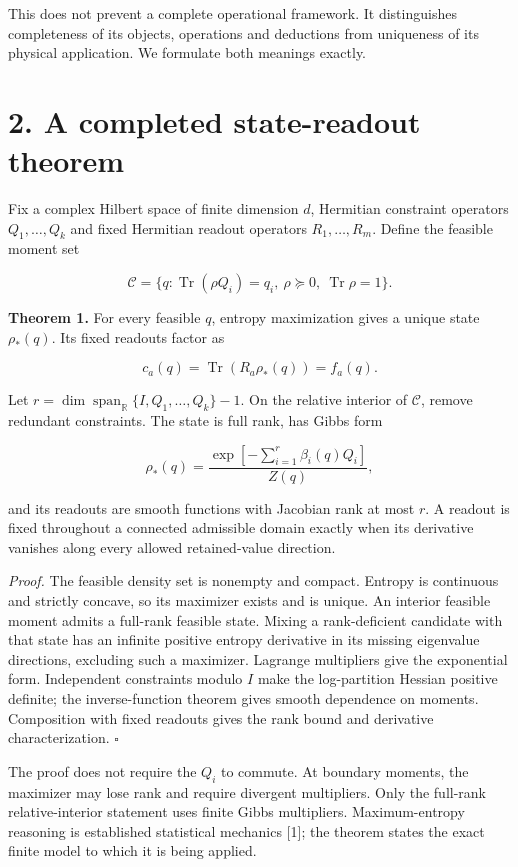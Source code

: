 \documentclass[
  11pt,
  a4paper,
]{article}
\begin{document}
This does not prevent a complete operational framework. It distinguishes completeness of its objects, operations and deductions from uniqueness of its physical application. We formulate both meanings exactly.

\section{2. A completed state-readout theorem}\label{a-completed-state-readout-theorem}

Fix a complex Hilbert space of finite dimension \(d\), Hermitian constraint operators \(Q_1,\ldots,Q_k\) and fixed Hermitian readout operators \(R_1,\ldots,R_m\). Define the feasible moment set

\[\mathcal C=\{q:\operatorname{Tr}(\rho Q_i)=q_i,
\ \rho\succeq0,\ \operatorname{Tr}\rho=1\}.\]

\textbf{Theorem 1.} For every feasible \(q\), entropy maximization gives a unique state \(\rho_*(q)\). Its fixed readouts factor as

\[c_a(q)=\operatorname{Tr}(R_a\rho_*(q))=f_a(q).\]

Let \(r=\dim\operatorname{span}_{\mathbb R}\{I,Q_1,\ldots,Q_k\}-1\). On the relative interior of \(\mathcal C\), remove redundant constraints. The state is full rank, has Gibbs form

\[\rho_*(q)=\frac{\exp[-\sum_{i=1}^r\beta_i(q)Q_i]}{Z(q)},\]

and its readouts are smooth functions with Jacobian rank at most \(r\). A readout is fixed throughout a connected admissible domain exactly when its derivative vanishes along every allowed retained-value direction.

\emph{Proof.} The feasible density set is nonempty and compact. Entropy is continuous and strictly concave, so its maximizer exists and is unique. An interior feasible moment admits a full-rank feasible state. Mixing a rank-deficient candidate with that state has an infinite positive entropy derivative in its missing eigenvalue directions, excluding such a maximizer. Lagrange multipliers give the exponential form. Independent constraints modulo \(I\) make the log-partition Hessian positive definite; the inverse-function theorem gives smooth dependence on moments. Composition with fixed readouts gives the rank bound and derivative characterization. \(\square\)

The proof does not require the \(Q_i\) to commute. At boundary moments, the maximizer may lose rank and require divergent multipliers. Only the full-rank relative-interior statement uses finite Gibbs multipliers. Maximum-entropy reasoning is established statistical mechanics {[}1{]}; the theorem states the exact finite model to which it is being applied.
\end{document}
